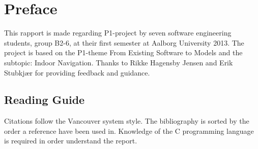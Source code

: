 \section{Preface}

This rapport is made regarding P1-project by seven software engineering students, group B2-6, at their first semester at Aalborg University 2013. The project is based on the P1-theme From Existing Software to Models and the subtopic: Indoor Navigation.
Thanks to Rikke Hagensby Jensen and Erik Stubkjær for providing feedback and guidance.

\subsection{Reading Guide}
Citations follow the Vancouver system style. The bibliography is sorted by the order a reference have been used in. 
Knowledge of the C programming language is required in order understand the report.